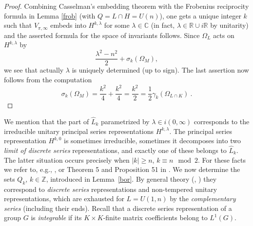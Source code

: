 \documentclass[10]{amsart}
\theoremstyle{remark}
\theoremstyle{definition}
\numberwithin{equation}{section}
\begin{document}
{\begin{proof} Combining Casselman's embedding theorem with the Frobenius reciprocity formula in Lemma \ref{frob} (with $Q=L\cap H=U(n)$), 
one gets a unique integer $k$ such that $V_{\pi,\infty}$ embeds into $H^{k,\lambda}$ for some $\lambda\in\mathbb{C}$ (in fact, $\lambda\in\mathbb{R}\cup i\mathbb{R}$ by unitarity) 
and the asserted formula for the space of invariants follows. Since $\Omega_L$ acts on $H^{k,\lambda}$ by 
$$\frac{\lambda^2-n^2}{2}+\sigma_k(\Omega_M),$$ 
we see that actually $\lambda$ is uniquely determined (up to sign). The last assertion now follows from the computation
$$\sigma_k(\Omega_M)=\frac{k^{2}}{4}+\frac{k^{2}}{4}=\frac{k^2}{2}=\frac{1}{2}\gamma_k(\Omega_{L\cap K})\ .$$
\end{proof}
%
\noindent
We mention that the part of $\widehat L_k$ parametrized by $\lambda\in i(0,\infty)$ corresponds to the irreducible unitary principal series representations $H^{k,\lambda}$. 
The principal series representation $H^{k,0}$ is sometimes irreducible, sometimes it decomposes into two {\it limit of discrete series} representations, and exactly one of 
these belongs to $\widehat L_k$. The latter situation occurs precisely when $|k|\geq n$, $k\equiv n \mod 2$. For these facts we refer to, e.g., \cite{Kn86}, or Theorem 5 and Proposition 51 
in \cite{KnS71}. 
We now determine the sets $Q_k$, $k\in\mathbb{Z}$, introduced in Lemma~\ref{bor}.
By general theory (\cite{Kn86}, \cite{KnS71}) they correspond to {\it discrete series} representations and non-tempered unitary representations, which are exhausted for $L=U(1,n)$ by the {\it complementary series} 
(including their ends). Recall that a discrete series representation of a group $G$ is {\it integrable} if its $K\times K$-finite matrix coefficients belong to $L^1(G)$.

}
\end{document}
